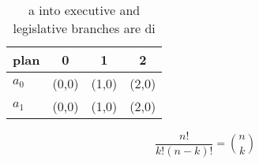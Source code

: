 \documentclass[a4paper]{article}
\begin{document}
\begin{table}
\begin{adjustbox}{width=0.6\columnwidth}
\begin{tabular}{|l|l|l|l|}
\hline
\textbf{plan} & \multicolumn{1}{c|}{\textbf{0}} & \multicolumn{1}{c|}{\textbf{1}} & \multicolumn{1}{c|}{\textbf{2}} \\ \hline
\textbf{$a_0$}  & (0,0) & (1,0) & (2,0) \\ \hline
\textbf{$a_1$}  & (0,0) & (1,0) & (2,0) \\ \hline
\end{tabular}
\end{adjustbox}
\caption{ a into executive and legislative branches are di
}
\end{table}

\[ \frac{n!}{k!(n-k)!} = \binom{n}{k} \]
\end{document}
